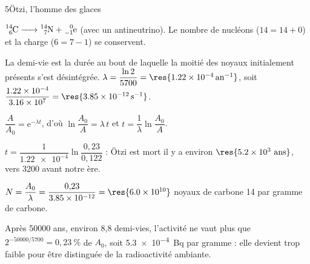 \begin{corrigeBac}{5}{Ötzi, l'homme des glaces}
\begin{questions}
\item $\ce{^{14}_{6}C -> ^{14}_{7}N + ^{0}_{-1}e}$ (avec un antineutrino). Le nombre de nucléons ($14=14+0$) et la charge
($6=7-1$) se conservent. 
\item La demi-vie est la durée au bout de laquelle la moitié des noyaux initialement présents s'est désintégrée.
$\lambda=\dfrac{\ln2}{5700}=\res{\qty{1,22e-4}{an^{-1}}}$, soit $\dfrac{\num{1.22e-4}}{\num{3.16e7}}=\res{\qty{3,85e-12}{s^{-1}}}$. 
\item $\dfrac{A}{A_0}=\mathrm{e}^{-\lambda t}$, d'où $\ln\dfrac{A_0}{A}=\lambda\,t$ et $t=\dfrac{1}{\lambda}\ln\dfrac{A_0}{A}$. 
\item $t=\dfrac{1}{\num{1.22e-4}}\ln\dfrac{0{,}23}{0{,}122}$ : Ötzi est mort il y a environ $\res{\num{5.2e3}\ \text{ans}}$, vers 3200 avant notre ère. \pts{1 pt}
\item $N=\dfrac{A_0}{\lambda}=\dfrac{0{,}23}{\num{3.85e-12}}=\res{\num{6.0e10}}$ noyaux de carbone 14 par gramme de carbone. 
\item Après \num{50000} ans, environ 8,8 demi-vies, l'activité ne vaut plus que $2^{-50000/5700}=0{,}23~\%$ de $A_0$, soit
\qty{5,3e-4}{Bq} par gramme : elle devient trop faible pour être distinguée de la radioactivité ambiante. \pts{1 pt}
\end{questions}
\end{corrigeBac}
